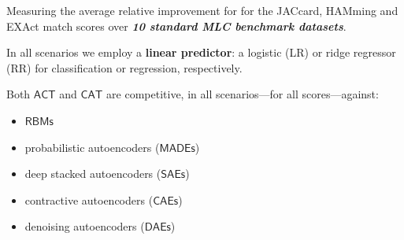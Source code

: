 \documentclass[xcolor={usenames,dvipsnames,svgnames}, compress]{beamer}
\begin{document}
\begin{frame}[t]
{\begin{minipage}{0.48\linewidth}
\begin{table}[!t]
\begin{tabular}{llrrrr}
  \end{tabular}
  \label{tab:aggr-scores}
\end{table}

\end{minipage}}\hspace{30pt}
\begin{minipage}{0.47\linewidth}
  \vspace{0pt}
  \raggedright
  \scriptsize

  Measuring the average relative improvement for for the \textsf{JAC}card,
  \textsf{HAM}ming and \textsf{EXA}ct match scores
  over \emph{\textbf{10 standard MLC benchmark datasets}}.\par\bigskip
  
  In all scenarios we employ a \textbf{linear predictor}: a logistic
  (\textsf{LR}) or ridge regressor (\textsf{RR}) for classification or
  regression, respectively.\par\bigskip
  
  Both $\mathsf{ACT}$ and $\mathsf{CAT}$ are competitive, in all
  scenarios---for all scores---against:
  \begin{itemize}
  \item $\mathsf{RBMs}$
  \item probabilistic autoencoders ($\mathsf{MADEs}$)
  \item deep stacked autoencoders ($\mathsf{SAEs}$)
  \item contractive autoencoders ($\mathsf{CAEs}$)
    \item denoising autoencoders ($\mathsf{DAEs}$)
  \end{itemize}


\end{minipage}
  \end{frame}
\end{document}
